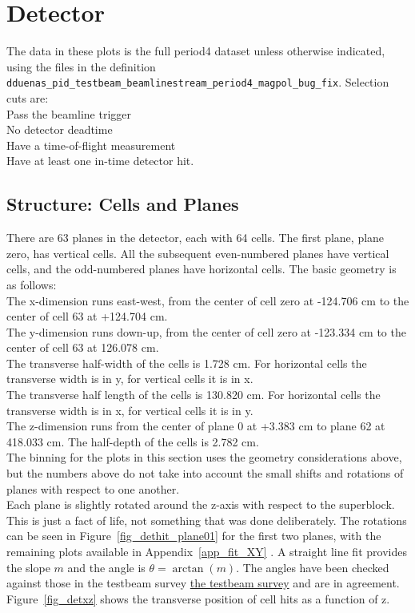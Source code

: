 \section{Detector}  
  
The data in these plots is the full period4 dataset unless otherwise indicated, using the files in the definition \texttt{dduenas\_pid\_testbeam\_beamlinestream\_period4\_magpol\_bug\_fix}. Selection cuts are:\\[1ex]
Pass the beamline trigger\\[1ex]
No detector deadtime\\[1ex]
Have a time-of-flight measurement\\[1ex]
Have at least one in-time detector hit.\\[1ex]



\subsection{Structure: Cells and Planes}
\noindent
There are 63 planes in the detector, each with 64 cells. The first plane, plane zero, has vertical cells. All the subsequent even-numbered planes have vertical cells, and the odd-numbered planes have horizontal cells. The basic geometry is as follows:\\[1ex]
The x-dimension runs east-west, from the center of cell zero at -124.706 cm to the center of cell 63 at +124.704 cm.\\
The y-dimension runs down-up, from the center of cell zero at -123.334 cm to the center of cell 63 at 126.078 cm.\\
The transverse half-width of the cells is 1.728 cm. For horizontal cells the transverse width is in y, for vertical cells it is in x.\\
The transverse half length of the cells is 130.820 cm. For horizontal cells the transverse width is in x, for vertical cells it is in y.\\
The z-dimension runs from the center of plane 0 at +3.383 cm to plane 62 at 418.033 cm. The half-depth of the cells is 2.782 cm.  \\
\noindent
The binning for the plots in this section uses the geometry considerations above, but the numbers above do not take into account the small shifts and rotations of planes with respect to one another.\\
\noindent
Each plane is slightly rotated around the z-axis with respect to the superblock. This is just a fact of life, not something that was done deliberately. The rotations can be seen in Figure~\ref{fig_dethit_plane01}  for the first two planes, with the remaining plots available in Appendix~\ref{app_fit_XY}  . A straight line fit provides the slope $m$ and the angle is $\theta= \arctan(m)$. The angles have been checked against those in the testbeam survey \href{https://github.com/novaexperiment/novasoft/blob/main/Geometry/gdml/tbscripts/tb_survey.txt}{the testbeam survey} and are in agreement.  Figure~\ref{fig_detxz} shows the transverse position of cell hits as a function of z.  
  



